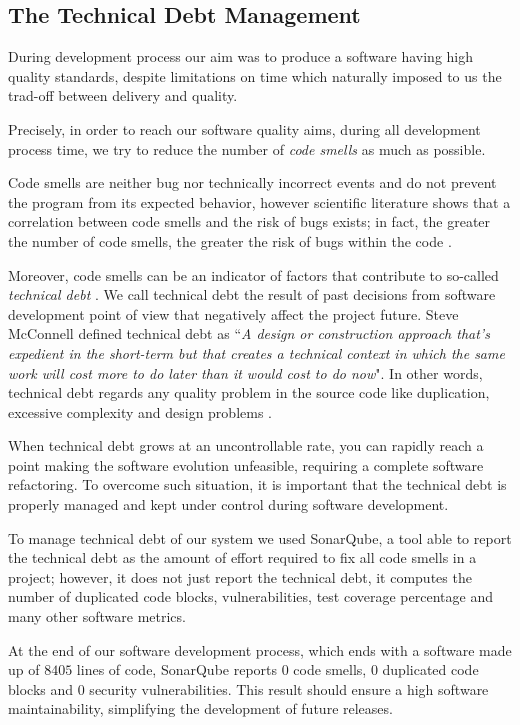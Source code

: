\documentclass[12pt,a4paper]{report}
\newcommand{\QuoteIntro}{``}
\begin{document}
\subsection{The Technical Debt Management}

During development process our aim was to produce a software having high quality standards, despite limitations on time which naturally imposed to us the trad-off
between delivery and quality. 

Precisely, in order to reach our software quality aims, during all development process time, we try to reduce the number of \textit{code smells} as much as possible. 

Code smells are neither bug nor technically incorrect events and do not prevent the program from its expected behavior, however scientific literature shows that a correlation between code smells and the risk of bugs exists; in fact, the greater the number of code smells, the greater the risk of bugs within the code \cite{CodeSmell}. 

Moreover, code smells can be an indicator of factors that contribute to so-called \textit{technical debt} \cite{CodeSmell}. We call technical debt the result of past decisions from software development point of view that negatively affect the project future. Steve McConnell defined technical debt as  \QuoteIntro \textit{A design or construction approach that's expedient in the short-term but that creates a technical context in which the same work will cost more to do later than it would cost to do now}". In other words, technical debt regards any quality problem in the source code like duplication, excessive complexity and design problems \cite{TechnicalDebt}\cite{TechnicalDebtFalessi}.

When technical debt grows at an uncontrollable rate, you can rapidly reach a point making the software evolution unfeasible, requiring a complete software refactoring. To overcome such situation, it is important that the technical debt is properly managed and kept under control during software development\cite{TechnicalDebt}.

To manage technical debt of our system we used SonarQube\cite{SonarQube}, a tool able to report the technical debt as the amount of effort required to fix all code smells in a project; however, it does not just report the technical debt, it computes the number of duplicated code blocks, vulnerabilities, test coverage percentage and many other software metrics.

At the end of our software development process, which ends with a software made up of $8405$ lines of code, SonarQube reports $0$ code smells, $0$ duplicated code blocks and $0$ security vulnerabilities. This result should ensure a high software maintainability, simplifying the development of future releases.
\end{document}
